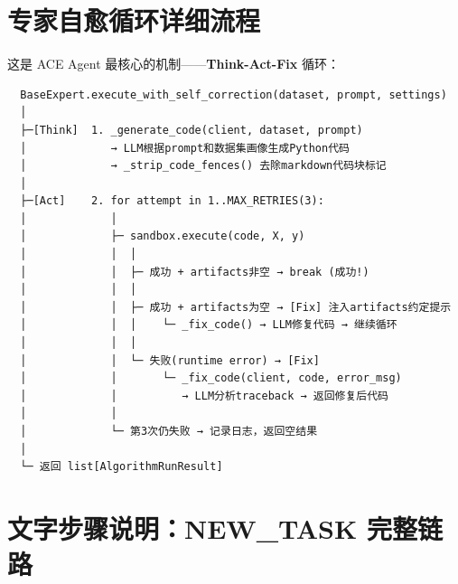 \documentclass[11pt,a4paper]{ctexbook}
\begin{document}
\section{专家自愈循环详细流程}

这是 ACE Agent 最核心的机制——\textbf{Think-Act-Fix} 循环：

\begin{tcolorbox}[title={\textbf{自愈循环：execute\_with\_self\_correction()}}, enhanced, breakable, colback=white]
{\small
\begin{verbatim}
  BaseExpert.execute_with_self_correction(dataset, prompt, settings)
  │
  ├─[Think]  1. _generate_code(client, dataset, prompt)
  │             → LLM根据prompt和数据集画像生成Python代码
  │             → _strip_code_fences() 去除markdown代码块标记
  │
  ├─[Act]    2. for attempt in 1..MAX_RETRIES(3):
  │             │
  │             ├─ sandbox.execute(code, X, y)
  │             │  │
  │             │  ├─ 成功 + artifacts非空 → break (成功!)
  │             │  │
  │             │  ├─ 成功 + artifacts为空 → [Fix] 注入artifacts约定提示
  │             │  │    └─ _fix_code() → LLM修复代码 → 继续循环
  │             │  │
  │             │  └─ 失败(runtime error) → [Fix]
  │             │       └─ _fix_code(client, code, error_msg)
  │             │          → LLM分析traceback → 返回修复后代码
  │             │
  │             └─ 第3次仍失败 → 记录日志，返回空结果
  │
  └─ 返回 list[AlgorithmRunResult]
\end{verbatim}
}
\end{tcolorbox}

\section{文字步骤说明：NEW\_TASK 完整链路}
\end{document}
